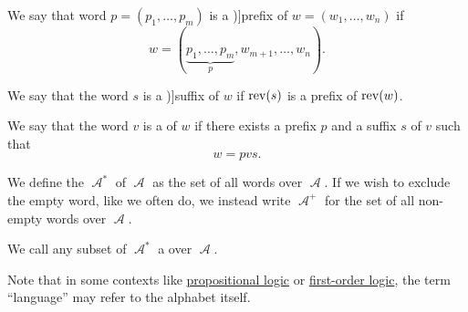 \begin{definition}
\begin{thmenum}
    \mimprovised We say that word \( p = (p_1, \ldots, p_m) \) is a \term[ru=начало (\cite[20]{Гладкий1973})]{prefix} of \( w = (w_1, \ldots, w_n) \) if
    \begin{equation*}
      w = (\underbrace{p_1, \ldots, p_m}_p, w_{m+1}, \ldots, w_n).
    \end{equation*}

    \mimprovised We say that the word \( s \) is a \term[ru=конец (\cite[20]{Гладкий1973})]{suffix} of \( w \) if \( \operatorname{rev}(s) \) is a prefix of \( \operatorname{rev}(w) \).

     We say that the word \( v \) is a  of \( w \) if there exists a prefix \( p \) and a suffix \( s \) of \( v \) such that
    \begin{equation*}
      w = p v s.
    \end{equation*}

     We define the  \( \mscrA^* \) of \( \mscrA \) as the set of all words over \( \mscrA \). If we wish to exclude the empty word, like we often do, we instead write \( \mscrA^+ \) for the set of all non-empty words over \( \mscrA \).

     We call any subset of \( \mscrA^* \) a  over \( \mscrA \).
  \end{thmenum}
\end{definition}
\begin{comments}
  \item Note that in some contexts like \hyperref[subsec:propositional_logic]{propositional logic} or \hyperref[subsec:first_order_logic]{first-order logic}, the term \enquote{language} may refer to the alphabet itself.
\end{comments}

